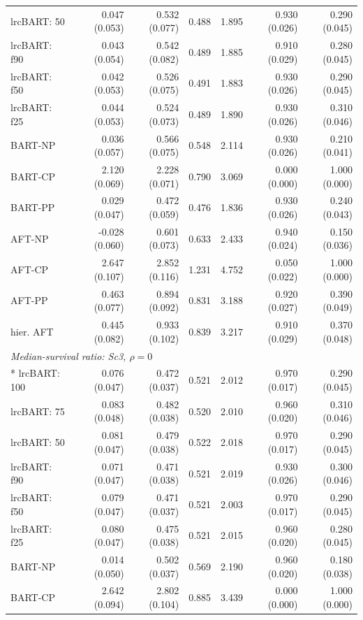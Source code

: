 \begin{landscape}
\begin{longtable}{lrrrrrr}
lrcBART: 50 & 0.047 (0.053) & 0.532 (0.077) & 0.488 & 1.895 & 0.930 (0.026) & 0.290 (0.045) \\
lrcBART: f90 & 0.043 (0.054) & 0.542 (0.082) & 0.489 & 1.885 & 0.910 (0.029) & 0.280 (0.045) \\
lrcBART: f50 & 0.042 (0.053) & 0.526 (0.075) & 0.491 & 1.883 & 0.930 (0.026) & 0.290 (0.045) \\
lrcBART: f25 & 0.044 (0.053) & 0.524 (0.073) & 0.489 & 1.890 & 0.930 (0.026) & 0.310 (0.046) \\
BART-NP & 0.036 (0.057) & 0.566 (0.075) & 0.548 & 2.114 & 0.930 (0.026) & 0.210 (0.041) \\
BART-CP & 2.120 (0.069) & 2.228 (0.071) & 0.790 & 3.069 & 0.000 (0.000) & 1.000 (0.000) \\
BART-PP & 0.029 (0.047) & 0.472 (0.059) & 0.476 & 1.836 & 0.930 (0.026) & 0.240 (0.043) \\
AFT-NP & -0.028 (0.060) & 0.601 (0.073) & 0.633 & 2.433 & 0.940 (0.024) & 0.150 (0.036) \\
AFT-CP & 2.647 (0.107) & 2.852 (0.116) & 1.231 & 4.752 & 0.050 (0.022) & 1.000 (0.000) \\
AFT-PP & 0.463 (0.077) & 0.894 (0.092) & 0.831 & 3.188 & 0.920 (0.027) & 0.390 (0.049) \\
hier. AFT & 0.445 (0.082) & 0.933 (0.102) & 0.839 & 3.217 & 0.910 (0.029) & 0.370 (0.048) \\
\multicolumn{7}{l}{\strut\textit{Median-survival ratio: Sc3, $\rho=0$}}\\*
lrcBART: 100 & 0.076 (0.047) & 0.472 (0.037) & 0.521 & 2.012 & 0.970 (0.017) & 0.290 (0.045) \\
lrcBART: 75 & 0.083 (0.048) & 0.482 (0.038) & 0.520 & 2.010 & 0.960 (0.020) & 0.310 (0.046) \\
lrcBART: 50 & 0.081 (0.047) & 0.479 (0.038) & 0.522 & 2.018 & 0.970 (0.017) & 0.290 (0.045) \\
lrcBART: f90 & 0.071 (0.047) & 0.471 (0.038) & 0.521 & 2.019 & 0.930 (0.026) & 0.300 (0.046) \\
lrcBART: f50 & 0.079 (0.047) & 0.471 (0.037) & 0.521 & 2.003 & 0.970 (0.017) & 0.290 (0.045) \\
lrcBART: f25 & 0.080 (0.047) & 0.475 (0.038) & 0.521 & 2.015 & 0.960 (0.020) & 0.280 (0.045) \\
BART-NP & 0.014 (0.050) & 0.502 (0.037) & 0.569 & 2.190 & 0.960 (0.020) & 0.180 (0.038) \\
BART-CP & 2.642 (0.094) & 2.802 (0.104) & 0.885 & 3.439 & 0.000 (0.000) & 1.000 (0.000) \\

\end{longtable}
\end{landscape}
